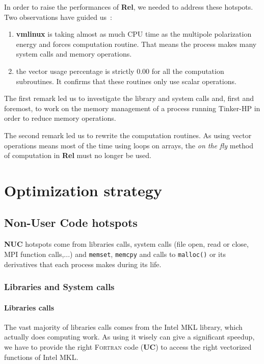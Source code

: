 \documentclass[9pt,comparison]{livecoms}
\newcommand{\lv}{\Large\verb}
\begin{document}
In order to raise the performances of \textbf{Rel}, we needed to address these hotspots. Two observations have guided us~:
\begin{enumerate}
    \item \textbf{vmlinux} is taking almost as much CPU time as the multipole polarization energy and forces computation routine. That means the process makes many system calls and memory operations. 
    \item the vector usage percentage is strictly $0.00$ for all the computation subroutines. It confirms that these routines only use scalar operations.
\end{enumerate}

The first remark led us to investigate the library and system calls and, first and foremost, to work on the memory management of a process running Tinker-HP in order to reduce memory operations.

The second remark led us to rewrite the computation routines. As using vector operations means most of the time using loops on arrays, the \emph{on the fly} method of computation in \textbf{Rel} must no longer be used. 

\section{Optimization strategy}
\subsection{Non-User Code hotspots}
\hspace{\parindent}\textbf{NUC} hotspots come from libraries calls, system calls (file open, read or close, MPI function calls,...) and {\color{codegreen}\lv|memset|}, {\color{codegreen}\lv|memcpy|} and calls to {\color{codegreen}\lv|malloc()|} or its derivatives that each process makes during its life.
\subsubsection{Libraries and System calls}
\paragraph{Libraries calls}
\hspace{\parindent}The vast majority of libraries calls comes from the Intel MKL library, which actually does computing work. As using it wisely can give a significant speedup, we have to provide the right \textsc{Fortran} code (\textbf{UC}) to access the right vectorized functions of Intel MKL.
\end{document}
